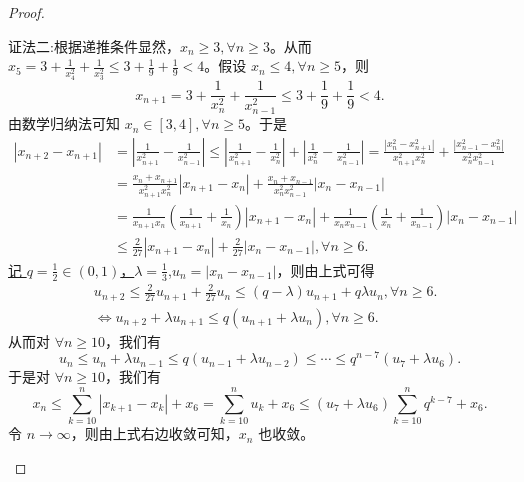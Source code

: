 \documentclass[../../main.tex]{subfiles}
\begin{document}
\begin{proof}
\begin{enumerate}
{\color{blue}证法二:}根据递推条件显然，\(x_n\geqslant 3,\forall n\geqslant 3\)。从而 \(x_5 = 3+\frac{1}{x_{4}^{2}}+\frac{1}{x_{3}^{2}}\leqslant 3+\frac{1}{9}+\frac{1}{9}<4\)。假设 \(x_n\leqslant 4,\forall n\geqslant 5\)，则
\[
x_{n + 1}=3+\frac{1}{x_{n}^{2}}+\frac{1}{x_{n - 1}^{2}}\leqslant 3+\frac{1}{9}+\frac{1}{9}<4.
\]
由数学归纳法可知 \(x_n\in [3,4],\forall n\geqslant 5\)。于是
\begin{align*}
\left| x_{n+2}-x_{n+1} \right|&=\left| \frac{1}{x_{n+1}^{2}}-\frac{1}{x_{n-1}^{2}} \right|\leqslant \left| \frac{1}{x_{n+1}^{2}}-\frac{1}{x_{n}^{2}} \right|+\left| \frac{1}{x_{n}^{2}}-\frac{1}{x_{n-1}^{2}} \right|=\frac{\left| x_{n}^{2}-x_{n+1}^{2} \right|}{x_{n+1}^{2}x_{n}^{2}}+\frac{\left| x_{n-1}^{2}-x_{n}^{2} \right|}{x_{n}^{2}x_{n-1}^{2}}
\\
&=\frac{x_n+x_{n+1}}{x_{n+1}^{2}x_{n}^{2}}\left| x_{n+1}-x_n \right|+\frac{x_n+x_{n-1}}{x_{n}^{2}x_{n-1}^{2}}\left| x_n-x_{n-1} \right|
\\
&=\frac{1}{x_{n+1}x_n}\left( \frac{1}{x_{n+1}}+\frac{1}{x_n} \right) \left| x_{n+1}-x_n \right|+\frac{1}{x_nx_{n-1}}\left( \frac{1}{x_n}+\frac{1}{x_{n-1}} \right) \left| x_n-x_{n-1} \right|
\\
&\leqslant \frac{2}{27}\left| x_{n+1}-x_n \right|+\frac{2}{27}\left| x_n-x_{n-1} \right|,\forall n\geqslant 6.      
\end{align*}
\hyperlink{取q,lambda的原因}{记 \(q = \frac{1}{2}\in(0,1)\)，\(\lambda=\frac{1}{3}\)},\(u_n = |x_n - x_{n - 1}|\)，则由上式可得
\begin{align*}
&u_{n + 2}\leqslant \frac{2}{27}u_{n + 1}+\frac{2}{27}u_n
\leqslant (q - \lambda)u_{n + 1}+q\lambda u_n,\forall n\geqslant 6.\\
&\iff u_{n + 2}+\lambda u_{n + 1}\leqslant q(u_{n + 1}+\lambda u_n),\forall n\geqslant 6.
\end{align*}
从而对 \(\forall n\geqslant 10\)，我们有
\[
u_n\leqslant u_n+\lambda u_{n - 1}\leqslant q(u_{n - 1}+\lambda u_{n - 2})\leqslant\cdots\leqslant q^{n - 7}(u_7+\lambda u_6).
\]
于是对 \(\forall n\geqslant 10\)，我们有
\[
x_n\leqslant \sum_{k = 10}^n|x_{k + 1}-x_k|+x_6=\sum_{k = 10}^n u_k+x_6\leqslant (u_7+\lambda u_6)\sum_{k = 10}^n q^{k - 7}+x_6.
\]
令 \(n\rightarrow\infty\)，则由上式右边收敛可知，\(x_n\) 也收敛。
\end{enumerate}    

\end{proof}
\end{document}
